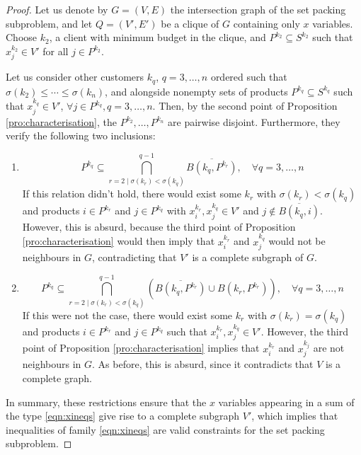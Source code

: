 \begin{proof}
    Let us denote by $G = (V, E)$ the intersection graph of the set packing
    subproblem, and let $Q = (V', E')$ be a clique of $G$ containing only $x$
    variables. Choose $k_2$, a client with minimum budget in the clique, and
    $P^{k_2} \subseteq S^{k_2}$ such that $x_j^{k_2} \in V'$ for all $j \in
    P^{k_2}$.

    Let us consider other customers $k_q$, $q = 3, \ldots, n$ ordered such that
    $\sigma(k_2) \leq \cdots \leq \sigma(k_n)$, and alongside nonempty sets of
    products $P^{k_q} \subseteq S^{k_q}$ such that $x_j^{k_q} \in V'$, $\forall
    j \in P^{k_q}, q = 3, \ldots, n$. Then, by the second point of Proposition
    \ref{pro:characterisation}, the $P^{k_2}, \ldots, P^{k_n}$ are pairwise
    disjoint. Furthermore, they verify the following two inclusions:
    \begin{enumerate}
        \item %
            \[
                P^{k_q} \subseteq
                    \bigcap_{r=2 \mid \sigma(k_r) < \sigma(k_q)}^{q-1}
                        \overline{B(k_q, P^{k_r})}
                , \quad \forall q = 3, \ldots, n
            \]
	    If this relation didn't hold, there would exist some $k_r$ with
	    $\sigma(k_r) < \sigma(k_q)$ and products $i \in P^{k_r}$ and $j \in
	    P^{k_q}$ with $x_i^{k_r}, x_j^{k_q} \in V'$ and $j \notin
	    \overline{B(k_q, i)}$. However, this is absurd, because the third
	    point of Proposition \ref{pro:characterisation} would then imply
	    that $x_i^{k_r}$ and $x_j^{k_q}$ would not be neighbours in $G$,
	    contradicting that $V'$ is a complete subgraph of $G$.
        \item %
            \[
                P^{k_q} \subseteq
                    \bigcap_{r=2 \mid \sigma(k_r) < \sigma(k_q)}^{q-1}
                        \left(
                                \overline{B(k_q, P^{k_r})}
                            \cup
                                B(k_r, P^{k_r})
                        \right)
                , \quad \forall q = 3, \ldots, n
            \]
	    If this were not the case, there would exist some $k_r$ with
	    $\sigma(k_r) = \sigma(k_q)$ and products $i \in P^{k_r}$ and $j \in
	    P^{k_q}$ such that $x_i^{k_r}, x_j^{k_q} \in V'$. However, the third
	    point of Proposition \ref{pro:characterisation} implies that
	    $x_i^{k_r}$ and $x_j^{k_j}$ are not neighbours in $G$. As before,
	    this is absurd, since it contradicts that $V$ is a complete graph.
    \end{enumerate}

    In summary, these restrictions ensure that the $x$ variables appearing in a
    sum of the type \ref{eqn:xineqs} give rise to a complete subgraph $V'$,
    which implies that inequalities of family \ref{eqn:xineqs} are valid
    constraints for the set packing subproblem.
\end{proof}

